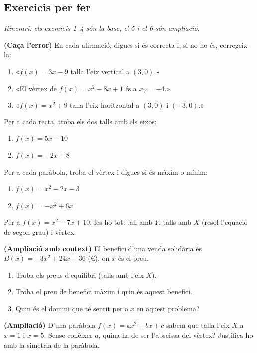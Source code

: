 \subsection{Exercicis per fer}

\noindent\textit{Itinerari: els exercicis 1–4 són la base; el 5 i el 6 són ampliació.}

\begin{exercicis}
\begin{exlist}
  \item \textbf{(Caça l'error)} En cada afirmació, digues si és correcta i, si no ho
        és, corregeix-la:
    \begin{enumerate}[label=\alph*), leftmargin=1.6em, topsep=2pt]
      \item «$f(x)=3x-9$ talla l'eix vertical a $(3,0)$.»
      \item «El vèrtex de $f(x)=x^2-8x+1$ és a $x_V=-4$.»
      \item «$f(x)=x^2+9$ talla l'eix horitzontal a $(3,0)$ i $(-3,0)$.»
    \end{enumerate}
  \item Per a cada recta, troba els dos talls amb els eixos:
    \begin{enumerate}[label=\alph*), leftmargin=1.6em, topsep=2pt]
      \item $f(x)=5x-10$
      \item $f(x)=-2x+8$
    \end{enumerate}
  \item Per a cada paràbola, troba el vèrtex i digues si és màxim o mínim:
    \begin{enumerate}[label=\alph*), leftmargin=1.6em, topsep=2pt]
      \item $f(x)=x^2-2x-3$
      \item $f(x)=-x^2+6x$
    \end{enumerate}
  \item Per a $f(x)=x^2-7x+10$, fes-ho tot: tall amb $Y$, talls amb $X$ (resol
        l'equació de segon grau) i vèrtex.
  \item \textbf{(Ampliació amb context)} El benefici d'una venda solidària és
        $B(x)=-3x^2+24x-36$ (€), on $x$ és el preu.
        \begin{enumerate}[label=\alph*), leftmargin=1.6em, topsep=2pt]
          \item Troba els preus d'equilibri (talls amb l'eix $X$).
          \item Troba el preu de benefici màxim i quin és aquest benefici.
          \item Quin és el domini que té sentit per a $x$ en aquest problema?
        \end{enumerate}
  \item \textbf{(Ampliació)} D'una paràbola $f(x)=ax^2+bx+c$ sabem que talla l'eix $X$
        a $x=1$ i $x=5$. Sense conèixer $a$, quina ha de ser l'abscissa del vèrtex?
        Justifica-ho amb la simetria de la paràbola.
\end{exlist}
\end{exercicis}

